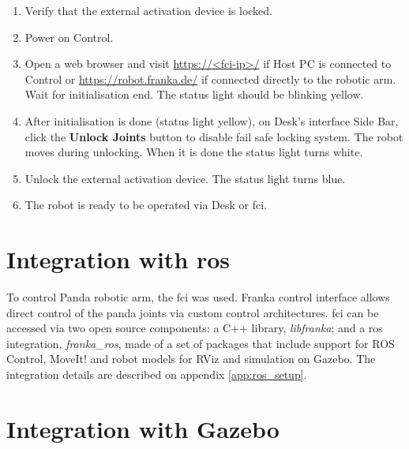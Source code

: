 \begin{enumerate}
    \item Verify that the external activation device is locked.
    \item Power on Control.
    \item Open a web browser and visit \url{https://<fci-ip>/} if Host PC is connected to Control or \url{https://robot.franka.de/} if connected directly to the robotic arm. Wait for initialisation end. The status light should be blinking yellow.
    \item After initialisation is done (status light yellow), on Desk's interface Side Bar, click the \textbf{Unlock Joints} button to disable fail safe locking system. The robot moves during unlocking. When it is done the status light turns white.
    \item Unlock the external activation device. The status light turns blue.
    \item The robot is ready to be operated via Desk or \gls{fci}.
\end{enumerate}




\section{Integration with \gls{ros}}
\label{sec:robotic_system_integration_ros}

To control Panda robotic arm, the \gls{fci} was used. Franka control interface allows direct control of the panda joints via custom control architectures. \gls{fci} can be accessed via two open source components: a C++ library, \textit{libfranka}; and a \gls{ros} integration, \textit{franka\_ros}, made of a set of packages that include support for ROS Control, MoveIt! and robot models for RViz and simulation on Gazebo. The integration details are described on appendix \ref{app:ros_setup}.



\section{Integration with Gazebo}
\label{sec:robotic_system_integration_gazebo}

